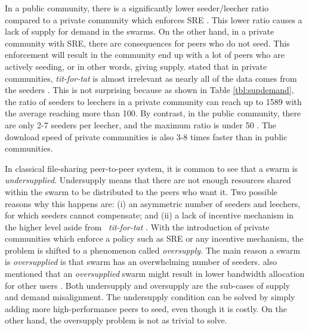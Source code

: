 In a public community, there is a significantly lower seeder/leecher ratio compared to a private community which enforces SRE \cite{2010:pubpriv:meulpolder,2009:demandsupplyres:andrade}. This lower ratio causes a lack of supply for demand in the swarms. On the other hand, in a private community with SRE, there are consequences for peers who do not seed. This enforcement will result in the community end up with a lot of peers who are actively seeding, or in other words, giving supply. \citeauthor{2010:pubpriv:meulpolder} stated that in private communities, \textit{tit-for-tat} is almost irrelevant as nearly all of the data comes from the seeders \cite{2010:pubpriv:meulpolder}. This is not surprising because as shown in Table \ref{tbl:supdemand}, the ratio of seeders to leechers in a private community can reach up to 1589 with the average reaching more than 100. By contrast, in the public community, there are only 2-7 seeders per leecher, and the maximum ratio is under 50 \cite{2010:pubpriv:meulpolder}. The download speed of private communities is also 3-8 times faster than in public communities. 

In classical file-sharing peer-to-peer system, it is common to see that a swarm is \textit{undersupplied}. Undersupply means that there are not enough resources shared within the swarm to be distributed to the peers who want it. Two possible reasons why this happens are: (i) an asymmetric number of seeders and leechers, for which seeders cannot compensate; and (ii) a lack of incentive mechanism in the higher level aside from \bt~\textit{tit-for-tat} \cite{2009:demandsupplyres:andrade}. With the introduction of private communities which enforce a policy such as SRE or any incentive mechanism, the problem is shifted to a phenomenon called \textit{oversupply}. The main reason a swarm is \textit{oversupplied} is that swarm has an overwhelming number of seeders. \citeauthor{2013:survivepriv:jia} also mentioned that an \textit{oversupplied} swarm might result in lower bandwidth allocation for other users \cite{2013:survivepriv:jia}. Both undersupply and oversupply are the sub-cases of supply and demand misalignment. The undersupply condition can be solved by simply adding more high-performance peers to seed, even though it is costly. On the other hand, the oversupply problem is not as trivial to solve.


